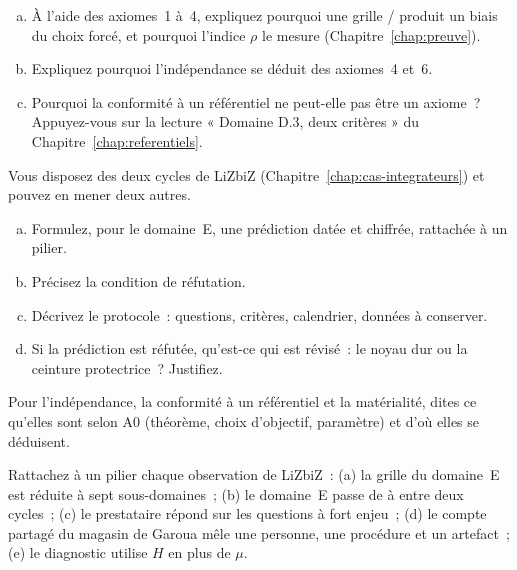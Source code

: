 \begin{boxexo}[title={\ding{45}\quad Exercice~30.2. Démontrer une proposition \niveaumoyen}]
\begin{enumerate}[(a)]
    \item À l'aide des axiomes~1 à~4, expliquez pourquoi une grille
          \OUI{}/\NON{} produit un biais du choix forcé, et pourquoi
          l'indice $\rho$ le mesure (Chapitre~\ref{chap:preuve}).
    \item Expliquez pourquoi l'indépendance se déduit des axiomes~4 et~6.
    \item Pourquoi la conformité à un référentiel ne peut-elle pas être un
          axiome~? Appuyez-vous sur la lecture « Domaine D.3, deux
          critères » du Chapitre~\ref{chap:referentiels}.
\end{enumerate}
\end{boxexo}

\begin{boxexo}[title={\ding{45}\quad Exercice~30.3. Formuler une prédiction réfutable \niveauexpert}]
Vous disposez des deux cycles de LiZbiZ (Chapitre~\ref{chap:cas-integrateurs})
et pouvez en mener deux autres.
\begin{enumerate}[(a)]
    \item Formulez, pour le domaine~E, une prédiction datée et chiffrée,
          rattachée à un pilier.
    \item Précisez la condition de réfutation.
    \item Décrivez le protocole~: questions, critères, calendrier, données
          à conserver.
    \item Si la prédiction est réfutée, qu'est-ce qui est révisé~: le noyau
          dur ou la ceinture protectrice~? Justifiez.
\end{enumerate}
\end{boxexo}

\bigskip

\begin{boxexo}[title={\ding{45}\quad Exercice~30.4. Ce qui n'est pas un axiome \niveaubase}]
Pour l'indépendance, la conformité à un référentiel et la matérialité,
dites ce qu'elles sont selon A0 (théorème, choix d'objectif, paramètre) et
d'où elles se déduisent.
\end{boxexo}

\begin{boxexo}[title={\ding{45}\quad Exercice~30.5. Reconnaître un pilier \niveaumoyen}]
Rattachez à un pilier chaque observation de LiZbiZ~: (a) la grille du
domaine~E est réduite à sept sous-domaines~; (b) le domaine~E passe de
\NEK{} à \NON{} entre deux cycles~; (c) le prestataire répond \NEK{} sur
les questions à fort enjeu~; (d) le compte partagé du magasin de Garoua
mêle une personne, une procédure et un artefact~; (e) le diagnostic utilise
$H$ en plus de $\mu$.
\end{boxexo}

